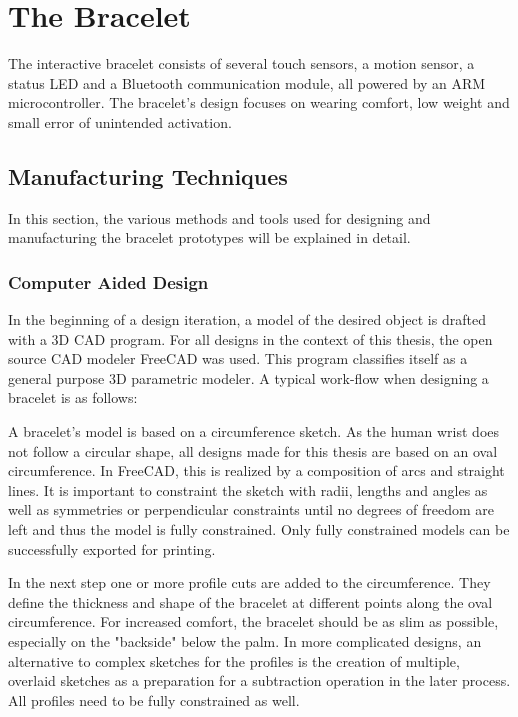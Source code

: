 \chapter{The Bracelet}

The interactive bracelet consists of several touch sensors, a motion sensor, a status \ac{LED} and a Bluetooth communication module, all powered by an ARM microcontroller. The bracelet's design focuses on wearing comfort, low weight and small error of unintended activation.

\section{Manufacturing Techniques}

In this section, the various methods and tools used for designing and manufacturing the bracelet prototypes will be explained in detail.

\subsection{Computer Aided Design}
In the beginning of a design iteration, a model of the desired object is drafted with a 3D \ac{CAD} program. For all designs in the context of this thesis, the open source \ac{CAD} modeler FreeCAD\cite{freecad} was used. This program classifies itself as a general purpose 3D parametric modeler. A typical work-flow when designing a bracelet is as follows:

A bracelet's model is based on a circumference sketch. As the human wrist does not follow a circular shape, all designs made for this thesis are based on an oval circumference. In FreeCAD, this is realized by a composition of arcs and straight lines. It is important to constraint the sketch with radii, lengths and angles as well as symmetries or perpendicular constraints until no degrees of freedom are left and thus the model is fully constrained. Only fully constrained models can be successfully exported for printing.

In the next step one or more profile cuts are added to the circumference. They define the thickness and shape of the bracelet at different points along the oval circumference. For increased comfort, the bracelet should be as slim as possible, especially on the "backside" below the palm. In more complicated designs, an alternative to complex sketches for the profiles is the creation of multiple, overlaid sketches as a preparation for a subtraction operation in the later process. All profiles need to be fully constrained as well.

